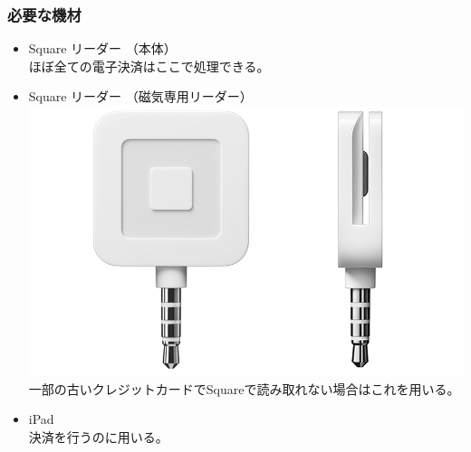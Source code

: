 \documentclass[dvipdfmx,jb5]{jarticle}
\begin{document}
 \subsubsection{必要な機材}
 \begin{itemize}
  \item Square リーダー （本体）\\
  ほぼ全ての電子決済はここで処理できる。
  \item Square リーダー （磁気専用リーダー）\\
  \includegraphics[scale=0.2]{assets/square_reader2.png}\\
  一部の古いクレジットカードでSquareで読み取れない場合はこれを用いる。
  \item iPad\\
  決済を行うのに用いる。
 \end{itemize}
\end{document}
